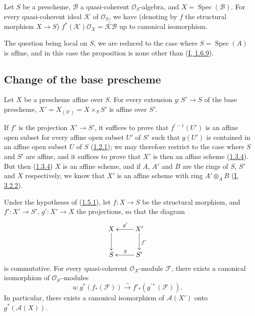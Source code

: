 \begin{proposition}[1.4.11]
\label{II.1.4.11}
Let $S$ be a prescheme, $\mathcal{B}$ a quasi-coherent
$\mathcal{O}_S$-algebra, and $X=\operatorname{Spec}(\mathcal{B})$. For every
quasi-coherent ideal $\mathcal{K}$ of $\mathcal{O}_S$, we have (denoting by
$f$ the structural morphism $X\to S$)
$f^*(\mathcal{K})\mathcal{O}_X=\widetilde{\mathcal{K}\mathcal{B}}$ up to
canonical isomorphism.
\end{proposition}

The question being local on $S$, we are reduced to the case where
$S=\operatorname{Spec}(A)$ is affine, and in this case the proposition is
none other than (\hyperref[I.1.6.9]{I, 1.6.9}).

\subsection{Change of the base prescheme}
\label{II.1.5}

\begin{proposition}[1.5.1]
\label{II.1.5.1}
Let $X$ be a prescheme affine over $S$. For every extension
$g:S'\to S$ of the base prescheme, $X'=X_{(S')}=X\times_S S'$ is affine
over $S'$.
\end{proposition}

If $f'$ is the projection $X'\to S'$, it suffices to prove that
$f^{\prime-1}(U')$ is an affine open subset for every affine open subset
$U'$ of $S'$ such that $g(U')$ is contained in an affine open subset $U$ of
$S$ (\hyperref[II.1.2.1]{1.2.1}); we may therefore restrict to the case
where $S$ and $S'$ are affine, and it suffices to prove that $X'$ is then an
affine scheme (\hyperref[II.1.3.4]{1.3.4}). But then
(\hyperref[II.1.3.4]{1.3.4}) $X$ is an affine scheme, and if $A$, $A'$
and $B$ are the rings of $S$, $S'$ and $X$ respectively, we know that $X'$
is an affine scheme with ring $A'\otimes_A B$
(\hyperref[I.3.2.2]{I, 3.2.2}).

\begin{corollary}[1.5.2]
\label{II.1.5.2}
Under the hypotheses of (\hyperref[II.1.5.1]{1.5.1}), let $f:X\to S$
be the structural morphism, and $f':X'\to S'$, $g':X'\to X$ the projections,
so that the diagram
\[
  \xymatrix{
    X\ar[d] & X'\ar[l]_{g'}\ar[d]^{f'}\\
    S & S'\ar[l]_g
  }
\]
is commutative. For every quasi-coherent $\mathcal{O}_X$-module
$\mathcal{F}$, there exists a canonical isomorphism of
$\mathcal{O}_{S'}$-modules
\[
  u:g^*(f_*(\mathcal{F}))\xrightarrow{\sim}
  f'_*(g^{\prime*}(\mathcal{F})).
  \tag{1.5.2.1}\label{II.1.5.2.1}
\]
In particular, there exists a canonical isomorphism of $\mathcal{A}(X')$
onto $g^*(\mathcal{A}(X))$.
\end{corollary}

